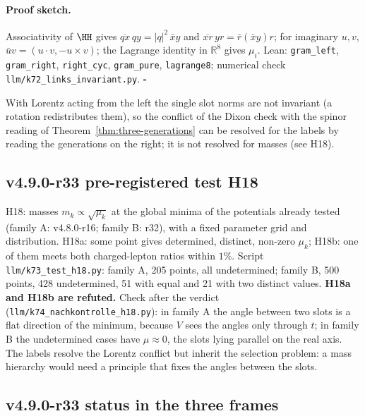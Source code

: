 \paragraph{Proof sketch.}
Associativity of \(\HH\) gives \(\overline{qx}\,qy=|q|^2\,\bar x y\) and \(\overline{xr}\,yr=\bar r(\bar xy)r\); for imaginary
\(u,v\), \(\bar uv=(u\cdot v,-u\times v)\); the Lagrange identity in \(\mathbb R^8\) gives \(\mu_i\).  Lean: \texttt{gram\_left},
\texttt{gram\_right}, \texttt{right\_cyc}, \texttt{gram\_pure}, \texttt{lagrange8}; numerical check
\texttt{llm/k72\_links\_invariant.py}.  \(\square\)

\noindent With Lorentz acting from the left the single slot norms are not invariant (a rotation redistributes them), so the
conflict of the Dixon check with the spinor reading of Theorem~\ref{thm:three-generations} can be resolved for the labels by
reading the generations on the right; it is not resolved for masses (see H18).

\subsection*{v4.9.0-r33 pre-registered test H18}
\label{subsec:v490-r33-h18}

H18: masses \(m_k\propto\sqrt{\mu_k}\) at the global minima of the potentials already tested (family A: v4.8.0-r16;
family B: r32), with a fixed parameter grid and distribution.  H18a: some point gives determined, distinct, non-zero
\(\mu_k\); H18b: one of them meets both charged-lepton ratios within \(1\%\).  Script \texttt{llm/k73\_test\_h18.py}: family A,
205 points, all undetermined; family B, 500 points, 428 undetermined, 51 with equal and 21 with two distinct values.
\textbf{H18a and H18b are refuted.}  Check after the verdict (\texttt{llm/k74\_nachkontrolle\_h18.py}): in family A the angle
between two slots is a flat direction of the minimum, because \(V\) sees the angles only through \(t\); in family B the
undetermined cases have \(\mu\approx0\), the slots lying parallel on the real axis.  The labels resolve the Lorentz conflict
but inherit the selection problem: a mass hierarchy would need a principle that fixes the angles between the slots.

\subsection*{v4.9.0-r33 status in the three frames}
\label{subsec:v490-r33-frames}

